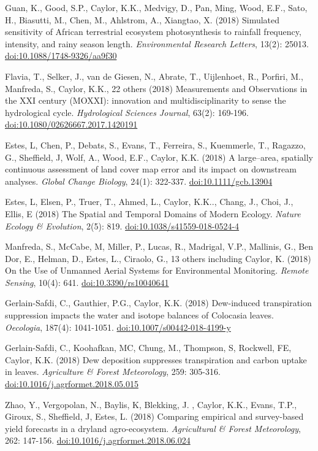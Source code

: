 \begin{etaremune}
\item Guan, K., Good, S.P., Caylor, K.K., Medvigy, D., Pan, Ming, Wood, E.F., Sato, H., Biasutti, M., Chen, M., Ahlstrom, A., Xiangtao, X. (2018) Simulated sensitivity of African terrestrial ecosystem photosynthesis to rainfall frequency, intensity, and rainy season length. \emph{Environmental Research Letters}, 13(2): 25013. \href{https://doi.org/10.1088/1748-9326/aa9f30}{doi:10.1088/1748-9326/aa9f30}
\item Flavia, T., Selker, J., van de Giesen, N., Abrate, T., Uijlenhoet, R., Porfiri, M., Manfreda, S., Caylor, K.K., 22 others (2018) Measurements and Observations in the XXI century (MOXXI): innovation and multidisciplinarity to sense the hydrological cycle. \emph{Hydrological Sciences Journal}, 63(2): 169-196. \href{https://doi.org/10.1080/02626667.2017.1420191}{doi:10.1080/02626667.2017.1420191}
\item Estes, L, Chen, P., Debats, S., Evans, T., Ferreira, S., Kuemmerle, T., Ragazzo, G., Sheffield, J, Wolf, A., Wood, E.F., Caylor, K.K. (2018) A large--area, spatially continuous assessment of land cover map error and its impact on downstream analyses. \emph{Global Change Biology}, 24(1): 322-337. \href{https://doi.org/10.1111/gcb.13904}{doi:10.1111/gcb.13904}
\item Estes, L, Elsen, P., Truer, T., Ahmed, L., Caylor, K.K.., Chang, J., Choi, J., Ellis, E (2018) The Spatial and Temporal Domains of Modern Ecology. \emph{Nature Ecology \& Evolution}, 2(5): 819. \href{https://doi.org/10.1038/s41559-018-0524-4}{doi:10.1038/s41559-018-0524-4}
\item Manfreda, S., McCabe, M, Miller, P., Lucas, R., Madrigal, V.P., Mallinis, G., Ben Dor, E., Helman, D., Estes, L., Ciraolo, G., 13 others including Caylor, K. (2018) On the Use of Unmanned Aerial Systems for Environmental Monitoring. \emph{Remote Sensing}, 10(4): 641. \href{https://doi.org/10.3390/rs10040641}{doi:10.3390/rs10040641}
\item Gerlain-Safdi, C., Gauthier, P.G., Caylor, K.K. (2018) Dew-induced transpiration suppression impacts the water and isotope balances of Colocasia leaves. \emph{Oecologia}, 187(4): 1041-1051. \href{https://doi.org/10.1007/s00442-018-4199-y}{doi:10.1007/s00442-018-4199-y}
\item Gerlain-Safdi, C., Koohafkan, MC, Chung, M., Thompson, S, Rockwell, FE, Caylor, K.K. (2018) Dew deposition suppresses transpiration and carbon uptake in leaves. \emph{Agriculture \& Forest Meteorology}, 259: 305-316. \href{https://doi.org/10.1016/j.agrformet.2018.05.015}{doi:10.1016/j.agrformet.2018.05.015}
\item Zhao, Y., Vergopolan, N., Baylis, K, Blekking, J. , Caylor, K.K., Evans, T.P., Giroux, S., Sheffield, J, Estes, L. (2018) Comparing empirical and survey-based yield forecasts in a dryland agro-ecosystem. \emph{Agricultural \& Forest Meteorology}, 262: 147-156. \href{https://doi.org/10.1016/j.agrformet.2018.06.024}{doi:10.1016/j.agrformet.2018.06.024}


\end{etaremune}
